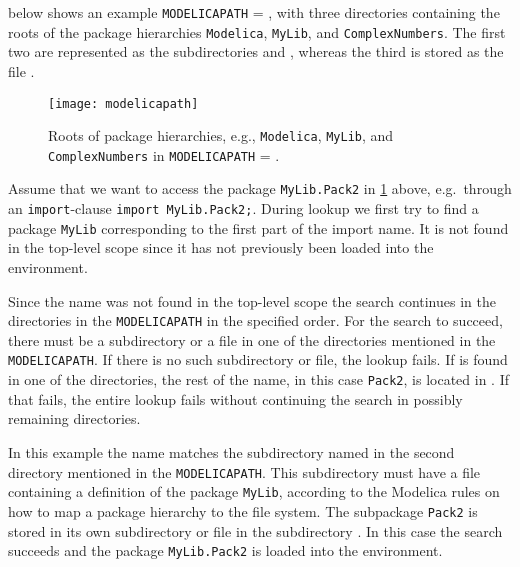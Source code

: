 \begin{example}
 below shows an example \lstinline!MODELICAPATH! = , with three
directories containing the roots of the package hierarchies \lstinline!Modelica!, \lstinline!MyLib!, and \lstinline!ComplexNumbers!.  The first two are represented as
the subdirectories  and , whereas the third is stored
as the file .

\begin{figure}[H]
\caption{%
Roots of package hierarchies, e.g., \lstinline!Modelica!, \lstinline!MyLib!, and \lstinline!ComplexNumbers! in
\lstinline!MODELICAPATH! = .
}
\label{fig:roots}
\texttt{[image: modelicapath]}
\end{figure}

Assume that we want to access the package \lstinline!MyLib.Pack2! in \cref{fig:roots} above, e.g.\ through an \lstinline!import!-clause \lstinline!import MyLib.Pack2;!.
During lookup we first try to find a package \lstinline!MyLib! corresponding to the first part of the import name.  It is not found in the top-level scope since it has not
previously been loaded into the environment.

Since the name was not found in the top-level scope the search continues in the directories in the \lstinline!MODELICAPATH! in the specified order.  For the search to succeed,
there must be a subdirectory  or a file  in one of the directories mentioned in the \lstinline!MODELICAPATH!.  If there is no such
subdirectory or file, the lookup fails.  If  is found in one of the directories, the rest of the name, in this case \lstinline!Pack2!, is located in
.  If that fails, the entire lookup fails without continuing the search in possibly remaining directories.

In this example the name matches the subdirectory named  in the second directory  mentioned in the \lstinline!MODELICAPATH!.
This subdirectory must have a file  containing a definition of the package \lstinline!MyLib!, according to the Modelica rules on how to map a package
hierarchy to the file system.  The subpackage \lstinline!Pack2! is stored in its own subdirectory or file in the subdirectory .  In this case the search
succeeds and the package \lstinline!MyLib.Pack2! is loaded into the environment.
\end{example}
